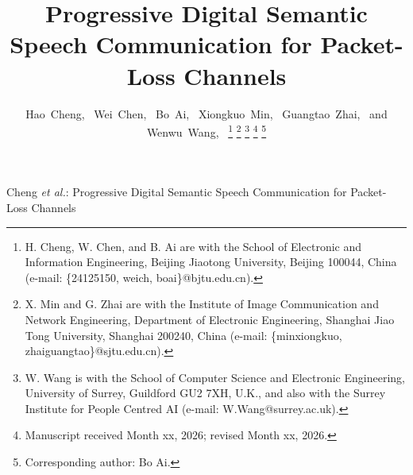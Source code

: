 \documentclass[lettersize,journal]{IEEEtran}
\begin{document}
\title{Progressive Digital Semantic Speech Communication for Packet-Loss Channels}

\author{Hao~Cheng,~
        Wei~Chen,~
        Bo~Ai,~
        Xiongkuo~Min,~
        Guangtao~Zhai,~ and
        Wenwu~Wang,~%
\thanks{H. Cheng, W. Chen, and B. Ai are with the School of Electronic and Information Engineering, Beijing Jiaotong University, Beijing 100044, China (e-mail: \{24125150, weich, boai\}@bjtu.edu.cn).}%
\thanks{X. Min and G. Zhai are with the Institute of Image Communication and Network Engineering, Department of Electronic Engineering, Shanghai Jiao Tong University, Shanghai 200240, China (e-mail: \{minxiongkuo, zhaiguangtao\}@sjtu.edu.cn).}%
\thanks{W. Wang is with the School of Computer Science and Electronic Engineering, University of Surrey, Guildford GU2 7XH, U.K., and also with the Surrey Institute for People Centred AI (e-mail: W.Wang@surrey.ac.uk).}%
\thanks{Manuscript received Month xx, 2026; revised Month xx, 2026.}%
\thanks{Corresponding author: Bo Ai.}}

%
{Cheng \MakeLowercase{\textit{et al.}}: Progressive Digital Semantic Speech Communication for Packet-Loss Channels}

\maketitle
\end{document}
